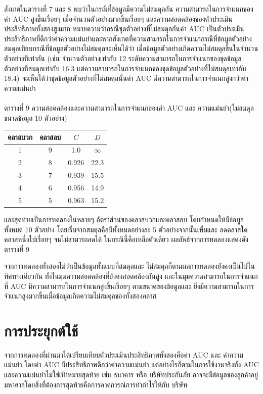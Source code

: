 \documentclass[twoside, twocolumn, 12pt]{article}
\begin{document}
สังเกตในตารางที่ 7 และ 8 พบว่าในกรณีที่ข้อมูลมีความไม่สมดุลกัน ความสามารถในการจำแนกของค่า AUC สูงขึ้นเรื่อยๆ เมื่อจำนวนตัวอย่างมากขึ้นเรื่อยๆ และความสอดคล้องของตัวประเมินประสิทธิภาพทั้งสองสูงมาก หมายความว่ากรณีชุดตัวอย่างที่ไม่สมดุลกันค่า AUC เป็นตัวประเมินประสิทธิภาพที่ดีกว่าค่าความแม่นยำและหากสังเกตที่ความสามารถในการจำแนกกรณีที่ข้อมูลตัวอย่างสมดุลเทียบกรณีที่ข้อมูลตัวอย่างไม่สมดุลจะเห็นได้ว่า เมื่อข้อมูลตัวอย่างเกิดความไม่สมดุลขึ้นในจำนวนตัวอย่างที่เท่ากัน (เช่น จำนวนตัวอย่างเท่ากับ 12 ระดับความสามารถในการจำแนกของชุดข้อมูลตัวอย่างที่สมดุลเท่ากับ 16.3 แต่ความสามารถในการจำแนกของชุดข้อมูลตัวอย่างที่ไม่สมดุลเท่ากับ 18.4) จะเห็นได้ว่าชุดข้อมูลตัวอย่างที่ไม่สมดุลนั้นค่า AUC มีความสามารถในการจำแนกสูงกว่าค่าความแม่นยำ
\\\\
ตารางที่ 9 ความสอดคล้องและความสามารถในการจำแนกของค่า AUC และ ความแม่นยำ(ไม่สมดุล ขนาดข้อมูล 10 ตัวอย่าง)
\begin{center}
\begin{tabular}{|cccc|}
\hline
คลาสบวก & คลาสลบ & $C$ & $D$\\
\hline
1&9&1.0 &$\infty$\\\hline
2&8&0.926&22.3\\\hline
3&7&0.939&15.5\\\hline
4&6&0.956&14.9\\\hline
5&5&0.963&15.2\\\hline
\end{tabular}
\end{center}

และสุดท้ายเป็นการทดลองในหลายๆ อัตราส่วนของคลาสบวกและคลาสลบ โดยกำหนดให้มีข้อมูลทั้งหมด 10 ตัวอย่าง โดยเริ่มจากสมดุลคือมีทั้งหมดอย่างละ 5 ตัวอย่างจากนั้นเพิ่มและ ลดคลาสใดคลาสหนึ่งไปเรื่อยๆ จนไม่สามารถลดได้ ในกรณีนี้คือเหลือตัวเดียว ผลลัพธ์จากการทดลองแสดงดังตารางที่ 9

จากการทดลองทั้งสองไม่ว่าเป็นข้อมูลทั้งแบบที่สมดุลและ ไม่สมดุลก็ตามผลการทดลองยังคงเป็นไปในทิศทางเดียวกัน ทั้งในมุมความสอดคล้องที่ยังคงสอดคล้องกันสูง และในมุมความสามารถในการจำแนกที่ AUC มีความสามารถในการจำแนกสูงขึ้นเรื่อยๆ ตามขนาดของข้อมูลและ ยิ่งมีความสามารถในการจำแนกสูงมากขึ้นเมื่อข้อมูลเกิดความไม่สมดุลของทั้งสองคลาส


\section{การประยุกต์ใช้}
\quad จากการทดลองที่ผ่านมาได้เปรียบเทียบตัวประเมินประสิทธิภาพทั้งสองคือค่า AUC และ ค่าความแม่นยำ โดยค่า AUC มีประสิทธิภาพดีกว่าค่าความแม่นยำ แต่อย่างไรก็ตามในการใช้งานจริงทั้ง AUC และความแม่นยำไม่ใช่เป้าหมายสุดท้าย เช่น  ธนาคาร หรือ บริษัทประกันภัย อาจจะมีข้อมูลของลูกค้าอยู่มหาศาลโดยสิ่งที่ต้องการสุดท้ายคือการคาดการณ์การทำกำไรให้กับ บริษัท
\end{document}
